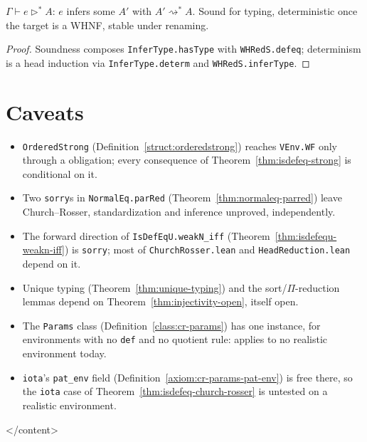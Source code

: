\begin{lemma}
\label{def:infertypes}
\leanok
{}

 $\Gamma\vdash e\triangleright^* A$: $e$ infers some $A'$ with
$A'\rightsquigarrow^* A$. Sound for typing, deterministic once the target is a WHNF, stable
under renaming.
\end{lemma}
\begin{proof}
\leanok
{} Soundness composes \texttt{InferType.hasType} with \texttt{WHRedS.defeq};
determinism is a head induction via \texttt{InferType.determ} and \texttt{WHRedS.inferType}.
\end{proof}

\section*{Caveats}
\label{sec:metatheory-review}

\begin{itemize}
\item \texttt{OrderedStrong} (Definition~\ref{struct:orderedstrong}) reaches \texttt{VEnv.WF}
      only through a \stSorry{} obligation; every consequence of
      Theorem~\ref{thm:isdefeq-strong} is conditional on it.
\item Two \texttt{sorry}s in \texttt{NormalEq.parRed} (Theorem~\ref{thm:normaleq-parred}) leave
      Church--Rosser, standardization and inference unproved, independently.
\item The forward direction of \texttt{IsDefEqU.weakN\_iff}
      (Theorem~\ref{thm:isdefequ-weakn-iff}) is \texttt{sorry}; most of
      \texttt{ChurchRosser.lean} and \texttt{HeadReduction.lean} depend on it.
\item Unique typing (Theorem~\ref{thm:unique-typing}) and the sort/$\Pi$-reduction lemmas
      depend on Theorem~\ref{thm:injectivity-open}, itself open.
\item The \texttt{Params} class (Definition~\ref{class:cr-params}) has one instance, for
      environments with no \texttt{def} and no quotient rule: applies to no realistic
      environment today.
\item \texttt{iota}'s \texttt{pat\_env} field (Definition~\ref{axiom:cr-params-pat-env}) is
      free there, so the \texttt{iota} case of Theorem~\ref{thm:isdefeq-church-rosser} is
      untested on a realistic environment.
\end{itemize}
</content>
